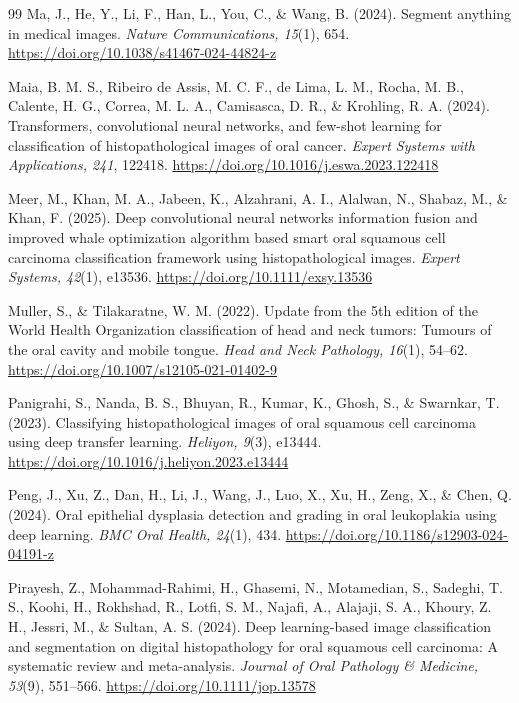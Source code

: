 \documentclass[10pt,twocolumn]{article}
\begin{document}
\begin{thebibliography}{99}
Ma, J., He, Y., Li, F., Han, L., You, C., \& Wang, B. (2024). Segment anything in medical images. \textit{Nature Communications, 15}(1), 654. \url{https://doi.org/10.1038/s41467-024-44824-z}

Maia, B. M. S., Ribeiro de Assis, M. C. F., de Lima, L. M., Rocha, M. B., Calente, H. G., Correa, M. L. A., Camisasca, D. R., \& Krohling, R. A. (2024). Transformers, convolutional neural networks, and few-shot learning for classification of histopathological images of oral cancer. \textit{Expert Systems with Applications, 241}, 122418. \url{https://doi.org/10.1016/j.eswa.2023.122418}

Meer, M., Khan, M. A., Jabeen, K., Alzahrani, A. I., Alalwan, N., Shabaz, M., \& Khan, F. (2025). Deep convolutional neural networks information fusion and improved whale optimization algorithm based smart oral squamous cell carcinoma classification framework using histopathological images. \textit{Expert Systems, 42}(1), e13536. \url{https://doi.org/10.1111/exsy.13536}

Muller, S., \& Tilakaratne, W. M. (2022). Update from the 5th edition of the World Health Organization classification of head and neck tumors: Tumours of the oral cavity and mobile tongue. \textit{Head and Neck Pathology, 16}(1), 54--62. \url{https://doi.org/10.1007/s12105-021-01402-9}

Panigrahi, S., Nanda, B. S., Bhuyan, R., Kumar, K., Ghosh, S., \& Swarnkar, T. (2023). Classifying histopathological images of oral squamous cell carcinoma using deep transfer learning. \textit{Heliyon, 9}(3), e13444. \url{https://doi.org/10.1016/j.heliyon.2023.e13444}

Peng, J., Xu, Z., Dan, H., Li, J., Wang, J., Luo, X., Xu, H., Zeng, X., \& Chen, Q. (2024). Oral epithelial dysplasia detection and grading in oral leukoplakia using deep learning. \textit{BMC Oral Health, 24}(1), 434. \url{https://doi.org/10.1186/s12903-024-04191-z}

Pirayesh, Z., Mohammad-Rahimi, H., Ghasemi, N., Motamedian, S., Sadeghi, T. S., Koohi, H., Rokhshad, R., Lotfi, S. M., Najafi, A., Alajaji, S. A., Khoury, Z. H., Jessri, M., \& Sultan, A. S. (2024). Deep learning-based image classification and segmentation on digital histopathology for oral squamous cell carcinoma: A systematic review and meta-analysis. \textit{Journal of Oral Pathology \& Medicine, 53}(9), 551--566. \url{https://doi.org/10.1111/jop.13578}


\end{thebibliography}
\end{document}
